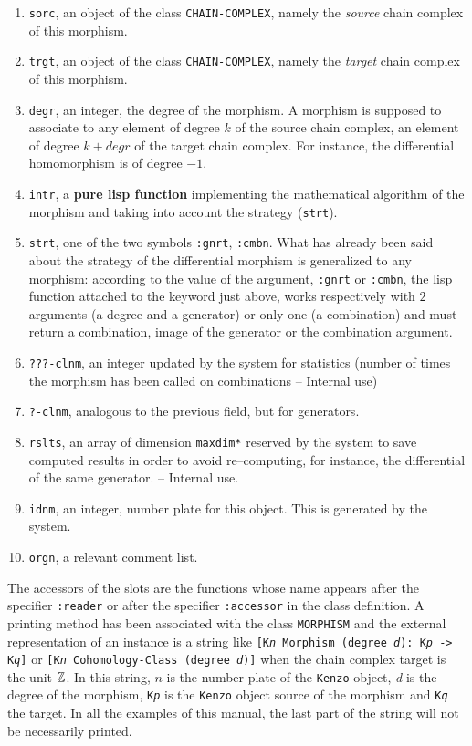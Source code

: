 \begin{enumerate}
\item {\tt sorc}, an object of the class {\tt CHAIN-COMPLEX}, namely the {\em source} chain complex
of this morphism.
\item {\tt trgt}, an object of the class {\tt CHAIN-COMPLEX}, namely the {\em target} chain complex of this morphism.
\item {\tt degr}, an integer, the degree of the morphism. A morphism is supposed to associate
to any element of degree $k$ of the source chain complex, an element of degree $k + degr$ of the
target chain complex. For instance, the differential homomorphism is of degree $-1$.
\item {\tt intr}, a {\bf pure lisp function} implementing the mathematical algorithm of the morphism and
taking into account the strategy ({\tt strt}).
\item {\tt strt}, one of the two symbols {\tt :gnrt}, {\tt :cmbn}. What has already been  said about
the strategy of the differential morphism is generalized to any morphism: according
to the value of the argument, {\tt :gnrt} or {\tt :cmbn}, the lisp function attached to the keyword just above,
works respectively with $2$ arguments (a degree and a generator) or
only one (a combination) and must return a combination, image of the generator or the combination argument.
\item {\tt ???-clnm}, an integer updated by the system for statistics (number of times the
morphism has been called on combinations -- Internal use)
\item {\tt ?-clnm}, analogous to the previous field, but for generators.
\item {\tt rslts}, an array of dimension {\tt *maxdim*} reserved by the system to save  computed
results in order to avoid  re--computing, for instance, the differential of the same
generator. -- Internal use.
\item {\tt idnm}, an integer, number plate for this object. This is generated by
the system.
\item {\tt orgn}, a relevant comment list.
\end{enumerate}
The accessors of the slots are the functions whose name appears after the specifier {\tt :reader}
or after the specifier {\tt :accessor} in the class definition.
A printing method has been associated with the class {\tt MORPHISM}
and the external representation of  an instance is a string like
{\tt [K{\em n} Morphism (degree {\em d}): K{\em p} -> K{\em q}]}
or {\tt [K{\em n} Cohomology-Class (degree {\em d})]}
when the chain complex target is the unit ${\mathbb{Z}}$. In this
string,  $n$ is the number plate of the {\tt Kenzo} object, {\em d} is the degree of the morphism,
{\tt K{\em p}} is the {\tt Kenzo} object source of the morphism and {\tt K{\em q}} the target.
In all the  examples of this manual, the last part of the string will not be necessarily printed.

